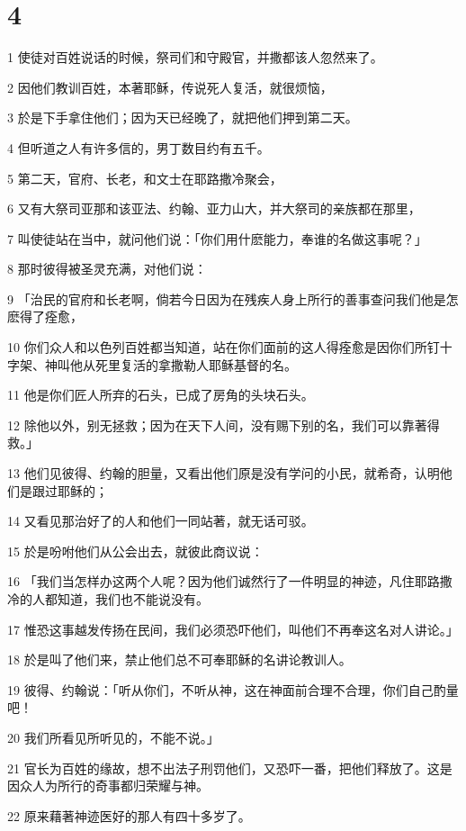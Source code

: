 \chapter{4}

\par 1 使徒对百姓说话的时候，祭司们和守殿官，并撒都该人忽然来了。
\par 2 因他们教训百姓，本著耶稣，传说死人复活，就很烦恼，
\par 3 於是下手拿住他们；因为天已经晚了，就把他们押到第二天。
\par 4 但听道之人有许多信的，男丁数目约有五千。
\par 5 第二天，官府、长老，和文士在耶路撒冷聚会，
\par 6 又有大祭司亚那和该亚法、约翰、亚力山大，并大祭司的亲族都在那里，
\par 7 叫使徒站在当中，就问他们说：「你们用什麽能力，奉谁的名做这事呢？」
\par 8 那时彼得被圣灵充满，对他们说：
\par 9 「治民的官府和长老啊，倘若今日因为在残疾人身上所行的善事查问我们他是怎麽得了痊愈，
\par 10 你们众人和以色列百姓都当知道，站在你们面前的这人得痊愈是因你们所钉十字架、神叫他从死里复活的拿撒勒人耶稣基督的名。
\par 11 他是你们匠人所弃的石头，已成了房角的头块石头。
\par 12 除他以外，别无拯救；因为在天下人间，没有赐下别的名，我们可以靠著得救。」
\par 13 他们见彼得、约翰的胆量，又看出他们原是没有学问的小民，就希奇，认明他们是跟过耶稣的；
\par 14 又看见那治好了的人和他们一同站著，就无话可驳。
\par 15 於是吩咐他们从公会出去，就彼此商议说：
\par 16 「我们当怎样办这两个人呢？因为他们诚然行了一件明显的神迹，凡住耶路撒冷的人都知道，我们也不能说没有。
\par 17 惟恐这事越发传扬在民间，我们必须恐吓他们，叫他们不再奉这名对人讲论。」
\par 18 於是叫了他们来，禁止他们总不可奉耶稣的名讲论教训人。
\par 19 彼得、约翰说：「听从你们，不听从神，这在神面前合理不合理，你们自己酌量吧！
\par 20 我们所看见所听见的，不能不说。」
\par 21 官长为百姓的缘故，想不出法子刑罚他们，又恐吓一番，把他们释放了。这是因众人为所行的奇事都归荣耀与神。
\par 22 原来藉著神迹医好的那人有四十多岁了。
